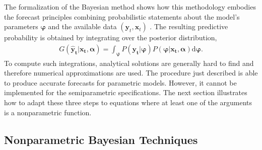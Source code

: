 \documentclass{article}\usepackage[]{graphicx}\usepackage[]{color}
\begin{document}
The formalization of the Bayesian method shows how this methodology embodies the forecast principles combining probabilistic statements about the model's parameters $ \mathbf{\varphi} $ and the available data $ (\mathbf{y}_t,\mathbf{x}_t) $ . The resulting predictive probability is obtained by integrating over the posterior distribution,
\begin{align}\label{int}
G(\mathbf{\hat{y}_t} | \mathbf{x_t, \alpha}) = \int_{\mathbf{\varphi}} P(\mathbf{y_t} | \mathbf{\varphi}) P(\mathbf{\varphi} | \mathbf{x_t}, \mathbf{\alpha}) \text{d}\mathbf{\varphi}.
\end{align}
To compute such integrations, analytical solutions are generally hard to find and therefore numerical approximations are used. The procedure just described is able to produce accurate forecasts for parametric models. However, it cannot be implemented for the semiparametric specifications. The next section illustrates how to adapt these three steps to equations where at least one of the arguments is a nonparametric function. 

\subsection{Nonparametric Bayesian Techniques} \label{nonparametric techniques}
\end{document}
